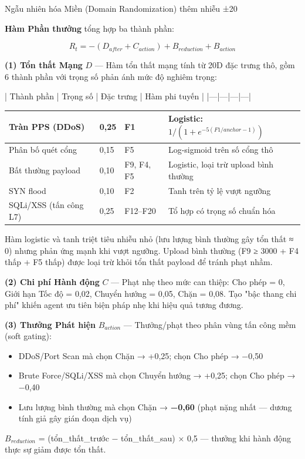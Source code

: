 \documentclass[12pt,a4paper,twoside]{report}
\begin{document}
{Ngẫu nhiên hóa Miền (Domain Randomization) thêm nhiễu ±20%

\textbf{Hàm Phần thưởng} tổng hợp ba thành phần:

$$R_t = -(D_{after} + C_{action}) + B_{reduction} + B_{action}$$

\textbf{(1) Tổn thất Mạng} $D$ — Hàm tổn thất mạng tính từ 20D đặc trưng thô, gồm 6 thành phần với trọng số phản ánh mức độ nghiêm trọng:

| Thành phần | Trọng số | Đặc trưng | Hàm phi tuyến |
|---|---|---|---|


\begin{tabular}{p{2.5cm}p{2.5cm}p{2.5cm}p{2.5cm}}
\hline
Tràn PPS (DDoS) & 0,25 & F1 & Logistic: $1/(1+e^{-5(F1/anchor - 1)})$ \\
\hline
Phân bố quét cổng & 0,15 & F5 & Log-sigmoid trên số cổng thô \\
Bất thường payload & 0,10 & F9, F4, F5 & Logistic, loại trừ upload bình thường \\
SYN flood & 0,10 & F2 & Tanh trên tỷ lệ vượt ngưỡng \\
SQLi/XSS (tấn công L7) & 0,25 & F12–F20 & Tổ hợp có trọng số chuẩn hóa \\
\hline
\end{tabular}

Hàm logistic và tanh triệt tiêu nhiễu nhỏ (lưu lượng bình thường gây tổn thất ≈ 0) nhưng phản ứng mạnh khi vượt ngưỡng. Upload bình thường (F9 ≥ 3000 + F4 thấp + F5 thấp) được loại trừ khỏi tổn thất payload để tránh phạt nhầm.

\textbf{(2) Chi phí Hành động} $C$ — Phạt nhẹ theo mức can thiệp: Cho phép = 0, Giới hạn Tốc độ = 0,02, Chuyển hướng = 0,05, Chặn = 0,08. Tạo "bậc thang chi phí" khiến agent ưu tiên biện pháp nhẹ khi hiệu quả tương đương.

\textbf{(3) Thưởng Phát hiện} $B_{action}$ — Thưởng/phạt theo phân vùng tấn công mềm (soft gating):
\begin{itemize}
\item DDoS/Port Scan mà chọn Chặn → +0,25; chọn Cho phép → −0,50
\item Brute Force/SQLi/XSS mà chọn Chuyển hướng → +0,25; chọn Cho phép → −0,40
\item Lưu lượng bình thường mà chọn Chặn → \textbf{−0,60} (phạt nặng nhất — dương tính giả gây gián đoạn dịch vụ)
\end{itemize}

$B_{reduction}$ = (tổn_thất_trước − tổn_thất_sau) × 0,5 — thưởng khi hành động thực sự giảm được tổn thất.

}
\end{document}
